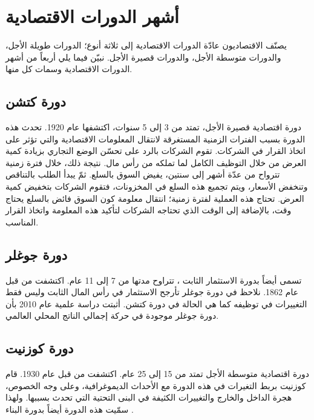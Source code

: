\section{أشهر الدورات الاقتصادية}
يصنّف الاقتصاديون عادّة الدورات الاقتصادية إلى ثلاثة أنوع؛ الدورات	طويلة الأجل، والدورات متوسطة الأجل، والدورات قصيرة الأجل.
نبيّن فيما يلي أربعاً من أشهر الدورات الاقتصادية وسمات كل منها.
\subsection{دورة كتشن }
دورة اقتصادية قصيرة الأجل، تمتد من 3 إلى 5 سنوات،
اكتشفها  عام 1920.
تحدث هذه الدورة بسبب الفترات الزمنية المستغرقة لانتقال المعلومات
الاقتصادية والتي تؤثر على اتخاذ القرار في الشركات.
تقوم الشركات بالرد على تحسّن الوضع التجاري بزيادة كمية العرض
من خلال التوظيف الكامل لما تملكه من رأس مال.
نتيجة ذلك، خلال فترة زمنية تترواح من عدّة أشهر إلى سنتين،
يفيض السوق بالسلع. ثمّ يبدأ الطلب بالتناقص وتنخفض الأسعار،
ويتم تجميع هذه السلع في المخزونات، فتقوم الشركات بتخفيض
كمية العرض. تحتاج هذه العملية لفترة زمنية؛ انتقال معلومة
كون السوق فائض بالسلع يحتاج وقت، بالإضافة إلى الوقت الذي
تحتاجه الشركات لتأكيد هذه المعلومة واتخاذ القرار المناسب.

\subsection{دورة جوغلر }
تسمى أيضاً بدورة 
الاستثمار الثابت ، 
تتراوح مدتها من 7 إلى 11 عام.
اكتشفت من قبل  عام 1862.
نلاحظ في دورة جوغلر تأرجح الاستثمار في
رأس المال الثابت  وليس فقط التغييرات
في توظيفه كما هي الحالة في دورة كتشن.
أثبتت دراسة علمية عام 2010 بأن دورة جوغلر موجودة
في حركة إجمالي الناتج المحلي العالمي.



\subsection{دورة كوزنيت }
دورة اقتصادية متوسطة الأجل تمتد من 15 إلى 25 عام.
اكتشفت من قبل  عام 1930.
قام كوزنيت بربط التغيرات في هذه الدورة مع الأحداث الديموغرافية،
وعلى وجه الخصوص، هجرة الداخل والخارج 
والتغييرات الكثيفة في البنى التحتية التي تحدث بسببها.
ولهذا سمّيت هذه الدورة أيضاً بدورة البناء .


